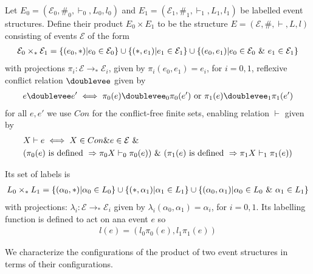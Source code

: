 \documentclass{article}
\begin{document}
\begin{definition}
    
Let $E_0 = (\mathcal{E}_0,\#_0,\vdash_0,L_0,l_0)$ and $E_1 = (\mathcal{E}_1,\#_1,\vdash_1,L_1,l_1)$
be labelled event structures.
Define their product $E_0 \times E_1$ to be the structure $E = (\mathcal{E},\#,\vdash,L,l)$ 
consisting of events $\mathcal{E}$ of the form
\begin{align*}
    \mathcal{E}_0 \times_* \mathcal{E}_1 = 
    \{(e_0,*)|e_0 \in \mathcal{E}_0\}
    \cup \{(*,e_1)|e_1 \in \mathcal{E}_1\}
    \cup \{(e_0,e_1)| e_0 \in \mathcal{E}_0 \ \& \  e_1 \in \mathcal{E}_1\}
\end{align*}
with projections $\pi_i : \mathcal{E} \rightarrow_* \mathcal{E}_i$,
given by $\pi_i(e_0,e_1) = e_i$, for $i=0,1$, reflexive conflict relation $\doublevee$ given by
\begin{align*}
    e \doublevee e' \iff \pi_0(e) \doublevee_0 \pi_0(e') \text{ or }
    \pi_1(e) \doublevee_1 \pi_1(e')
\end{align*}
for all $e,e'$ we use $Con$ for the conflict-free finite sets, 
enabling relation $\vdash$ given by
\begin{align*}
    & X \vdash e \iff X \in Con \& e \in \mathcal{E} \ \& \  \\
    & (\pi_0(e)\text{ is defined } \Rightarrow \pi_0X\vdash_0\pi_0(e))
        \ \& \  (\pi_1(e)\text{ is defined } \Rightarrow \pi_1X\vdash_1\pi_1(e))
\end{align*}

Its set of labels is 
\begin{align*}
    L_0 \times_* L_1 = \{ (\alpha_0,*)|\alpha_0 \in L_0\}
    \cup \{(*,\alpha_1)|\alpha_1 \in L_1\} 
    \cup \{(\alpha_0,\alpha_1)|\alpha_0 \in L_0 \ \& \  \alpha_1 \in L_1\}
\end{align*}
with projections: $\lambda_i: \mathcal{E} \rightarrow_* \mathcal{E}_i$ given by 
$\lambda_i(\alpha_0,\alpha_1) = \alpha_i$, for $i=0,1$.
Its labelling function is defined to act on ana event $e$ so
\begin{align*}
    l(e) = (l_0\pi_0(e),l_1\pi_1(e))
\end{align*}

\end{definition}
We characterize the configurations of the product of two event structures in terms 
of their configurations.
\end{document}
